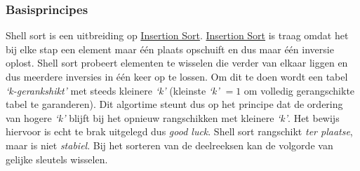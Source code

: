 \documentclass{article}
\begin{document}
\subsubsection{Basisprincipes} %
\label{sub:shell_sort_basisprincipes}
Shell sort is een uitbreiding op \hyperref[sub:insertion_sort]{Insertion Sort}. \hyperref[sub:insertion_sort]{Insertion Sort} is traag omdat het bij elke stap een element maar één plaats opschuift en dus maar één inversie oplost. Shell sort probeert elementen te wisselen die verder van elkaar liggen en dus meerdere inversies in één keer op te lossen. Om dit te doen wordt een tabel \textit{`k-gerankshikt'} met steeds kleinere \textit{`k'} (kleinste \textit{`k'} $= 1$ om volledig gerangschikte tabel te garanderen). Dit algortime steunt dus op het principe dat de ordering van hogere \textit{`k'} blijft bij het opnieuw rangschikken met kleinere \textit{`k'}. Het bewijs hiervoor is echt te brak uitgelegd dus \textit{good luck}. Shell sort rangschikt \textit{ter plaatse}, maar is niet \textit{stabiel}. Bij het sorteren van de deelreeksen kan de volgorde van gelijke sleutels wisselen.
\end{document}
